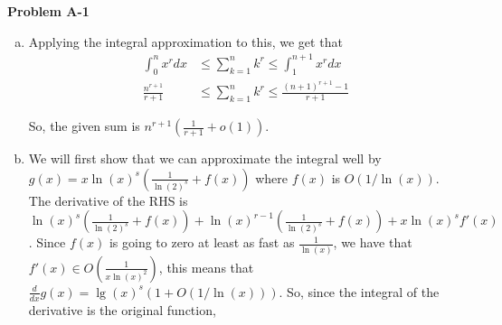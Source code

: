 \documentclass{article}
\begin{document}
 \noindent\textbf{Problem A-1}\\
\begin{enumerate}[a.]
\item
Applying the integral approximation to this, we get that
\begin{align*}
\int_{0}^{n} x^r dx &\le \sum_{k=1}^n k^r \le \int_{1}^{n+1} x^r dx\\
\frac{n^{r+1} }{r+1} &\le \sum_{k=1}^n k^r \le \frac{(n+1)^{r+1}-1}{r+1}
\end{align*}

So, the given sum is $n^{r+1}(\frac{1}{r+1} + o(1))$.

\item
\begin{comment}
We'll throw out the first term since in the integral approximation we'd be trying to evaluate the summand at 0 if we left the first term 1. This omission won't affect the sum at all because $\lg(1) = 0$.

We'll first try to bound the sum from below.
\[
\sum_{k=2}^n (\lg(k))^s  \ge \sum_{k=2}^n \frac{(\lg(k))^s}{k} \ge \int_{2}^{n+1} \frac{(\lg(x))^s}{x} dx  \in \Omega(lg(n)^{s+1})
\]
where the integral is valuated by a u-substitution with $u=\lg(x)$.

Now, we try to bound the sum from above.
\[
\sum_{k=2}^n (\lg(k))^s \le 
\]
\end{comment}
\begin{comment}
We'll split up the domain into $\lg(n)$ pieces. based on being between $1/2^i$ and $1/2^{i+1}$. This gets us
\begin{align*}
\sum_{k=1}^{k=n} &\ge(k)^s \ge \sum_{k=1}^{\lfloor \lg(n) \rfloor} \sum_{i=1}^{2^k} (\lg(2^{k} +i))^s 
&\ge \sum_{k=1}^{\lfloor \lg(n) \rfloor}  \sum_{i=1}^{2^k} (\lg(2^{k+1}))^s
& = \sum_{k=1}^{\lfloor \lg(n) \rfloor} 2^k (k+1)^s
\end{align*}
\end{comment}

We will first show that  we can approximate the integral well by $g(x) = x \ln(x)^s( \frac{1}{\ln(2)^s}+ f(x))$ where $f(x)$ is $O(1/\ln(x))$. The derivative of the RHS is $\ln(x)^s( \frac{1}{\ln(2)^s}+ f(x)) + \ln(x)^{r-1}( \frac{1}{\ln(2)^s}+ f(x)) +  x \ln(x)^s f'(x)$. Since $f(x)$ is going to zero at least as fast as $\frac{1}{\ln(x)}$, we have that $f'(x) \in O(\frac{1}{x\ln(x)^2})$, this means that $\frac{d}{dx} g(x) = \lg(x)^s ( 1+ O(1/\ln(x)))$. So, since the integral of the derivative is the original function, 


\end{enumerate}
\end{document}
